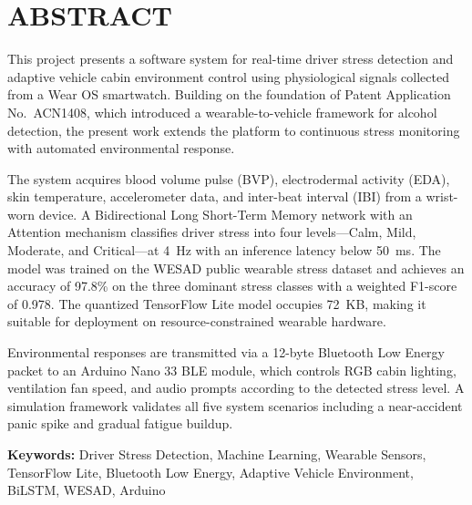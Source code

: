 \chapter*{ABSTRACT}

This project presents a software system for real-time driver stress detection and adaptive
vehicle cabin environment control using physiological signals collected from a Wear OS
smartwatch. Building on the foundation of Patent Application No.\ ACN1408, which introduced
a wearable-to-vehicle framework for alcohol detection, the present work extends the platform
to continuous stress monitoring with automated environmental response.

The system acquires blood volume pulse (BVP), electrodermal activity (EDA), skin temperature,
accelerometer data, and inter-beat interval (IBI) from a wrist-worn device. A Bidirectional
Long Short-Term Memory network with an Attention mechanism classifies driver stress into four
levels---Calm, Mild, Moderate, and Critical---at 4~Hz with an inference latency below 50~ms.
The model was trained on the WESAD public wearable stress dataset and achieves an accuracy of
97.8\% on the three dominant stress classes with a weighted F1-score of 0.978. The quantized
TensorFlow Lite model occupies 72~KB, making it suitable for deployment on resource-constrained
wearable hardware.

Environmental responses are transmitted via a 12-byte Bluetooth Low Energy packet to an
Arduino Nano 33 BLE module, which controls RGB cabin lighting, ventilation fan speed, and
audio prompts according to the detected stress level. A simulation framework validates all
five system scenarios including a near-accident panic spike and gradual fatigue buildup.

\textbf{Keywords:} Driver Stress Detection, Machine Learning, Wearable Sensors, TensorFlow
Lite, Bluetooth Low Energy, Adaptive Vehicle Environment, BiLSTM, WESAD, Arduino

